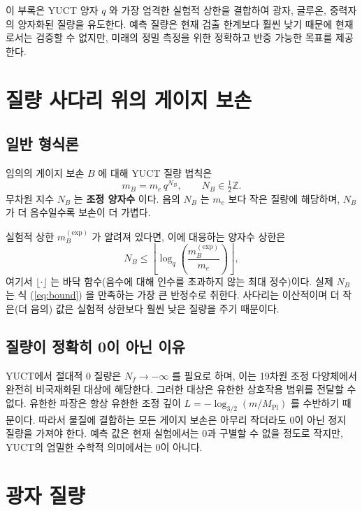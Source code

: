 \documentclass[11pt,a4paper]{article}
\newcommand{\Mpl}{M_{\mathrm{Pl}}}
\begin{document}
	이 부록은 YUCT 양자 $q$ 와 가장 엄격한 실험적 상한을 결합하여 광자, 글루온, 중력자의 양자화된 질량을 유도한다.
	예측 질량은 현재 검출 한계보다 훨씬 낮기 때문에 현재로서는 검증할 수 없지만, 미래의 정밀 측정을 위한 정확하고 반증 가능한 목표를 제공한다.
	
	\section{질량 사다리 위의 게이지 보손}
	
	\subsection{일반 형식론}
	
	임의의 게이지 보손 $B$ 에 대해 YUCT 질량 법칙은
	\begin{equation}\label{eq:bosonmass}
		m_B = m_e \, q^{N_B}, \qquad N_B \in \tfrac12\mathbb{Z}.
	\end{equation}
	무차원 지수 $N_B$ 는 \textbf{조정 양자수} 이다. 음의 $N_B$ 는 $m_e$ 보다 작은 질량에 해당하며, $N_B$ 가 더 음수일수록 보손이 더 가볍다.
	
	실험적 상한 $m_B^{\mathrm{(exp)}}$ 가 알려져 있다면, 이에 대응하는 양자수 상한은
	\begin{equation}\label{eq:bound}
		N_B \le \left\lfloor \log_q\!\left( \frac{m_B^{\mathrm{(exp)}}}{m_e} \right) \right\rfloor ,
	\end{equation}
	여기서 $\lfloor\cdot\rfloor$ 는 바닥 함수(음수에 대해 인수를 초과하지 않는 최대 정수)이다. 실제 $N_B$ 는 식 (\ref{eq:bound}) 을 만족하는 가장 큰 반정수로 취한다.
	사다리는 이산적이며 더 작은(더 음의) 값은 실험적 상한보다 훨씬 낮은 질량을 주기 때문이다.
	
	\subsection{질량이 정확히 0이 아닌 이유}
	
	YUCT에서 절대적 0 질량은 $N_f \to -\infty$ 를 필요로 하며, 이는 19차원 조정 다양체에서 완전히 비국재화된 대상에 해당한다.
	그러한 대상은 유한한 상호작용 범위를 전달할 수 없다. 유한한 파장은 항상 유한한 조정 깊이 $L = -\log_{3/2}(m/\Mpl)$ 를 수반하기 때문이다.
	따라서 물질에 결합하는 모든 게이지 보손은 아무리 작더라도 0이 아닌 정지 질량을 가져야 한다. 예측 값은 현재 실험에서는 0과 구별할 수 없을 정도로 작지만,
	YUCT의 엄밀한 수학적 의미에서는 0이 아니다.
	
	\section{광자 질량}
	
\end{document}
